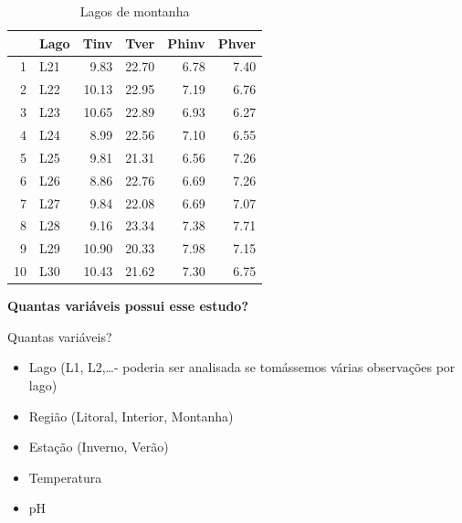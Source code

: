 \documentclass{beamer}\usepackage[]{graphicx}\usepackage[]{color}
\begin{document}
\begin{frame}[fragile]



\begin{tiny}
\begin{table}[ht]
\centering
\begin{tabular}{rlrrrr}
  \hline
 & Lago & Tinv & Tver & Phinv & Phver \\ 
  \hline
1 & L21 & 9.83 & 22.70 & 6.78 & 7.40 \\ 
  2 & L22 & 10.13 & 22.95 & 7.19 & 6.76 \\ 
  3 & L23 & 10.65 & 22.89 & 6.93 & 6.27 \\ 
  4 & L24 & 8.99 & 22.56 & 7.10 & 6.55 \\ 
  5 & L25 & 9.81 & 21.31 & 6.56 & 7.26 \\ 
  6 & L26 & 8.86 & 22.76 & 6.69 & 7.26 \\ 
  7 & L27 & 9.84 & 22.08 & 6.69 & 7.07 \\ 
  8 & L28 & 9.16 & 23.34 & 7.38 & 7.71 \\ 
  9 & L29 & 10.90 & 20.33 & 7.98 & 7.15 \\ 
  10 & L30 & 10.43 & 21.62 & 7.30 & 6.75 \\ 
   \hline
\end{tabular}
\caption{Lagos de montanha} 
\end{table}

\end{tiny}
\end{frame}

\begin{frame}
\centering
\textbf{Quantas variáveis possui esse estudo?}
\end{frame}

\begin{frame}{Quantas variáveis?}

\begin{itemize}
  \item Lago (L1, L2,\ldots - poderia ser analisada se tomássemos várias observações por lago) \pause
  \item Região (Litoral, Interior, Montanha) \pause
  \item Estação (Inverno, Verão) \pause
  \item Temperatura \pause
  \item pH
\end{itemize}

\end{frame}
\end{document}
